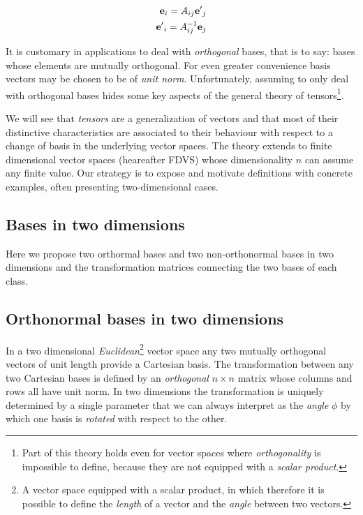 \begin{subequations}
\label{eq:twoway_basis_change}
\begin{align}
\vb{e}_i = A_{ij} {\vb{e}'}_j \\ 
{\vb{e}'}_i = A_{ij}^{-1} \vb{e}_j
\end{align}
\end{subequations}



It is customary in applications to deal with \textit{orthogonal} bases, that is to say: bases whose elements are mutually orthogonal. For even greater convenience basis vectors may be chosen to be of \textit{unit norm}. 
Unfortunately, assuming to only deal with orthogonal bases hides some key aspects of the general theory of tensors\footnote{Part of this theory holds even for vector spaces where \textit{orthogonality} is impossible to define, because they are not equipped with a \textit{scalar product}.}.   

We will see that \textit{tensors} are a generalization of vectors and that most of their distinctive characteristics are associated to their behaviour with respect to a change of basis in the underlying vector spaces. The theory extends to finite dimensional vector spaces (heareafter FDVS) whose dimensionality $n$ can assume any finite value. Our strategy is to expose and motivate definitions with concrete examples, often presenting two-dimensional cases.

\subsection{Bases in two dimensions}
Here we propose two orthormal bases and two non-orthonormal bases in two dimensions and the transformation matrices connecting the two bases of each class.  

\subsection{Orthonormal bases in two dimensions}
In a two dimensional \textit{Euclidean}\footnote{A vector space equipped with a scalar product, in which therefore it is possible to define the \textit{length} of a vector and the \textit{angle} between two vectors.} vector space any two mutually orthogonal vectors of unit length provide a Cartesian basis. The transformation between any two Cartesian bases is defined by an \textit{orthogonal} $n \times n$ matrix whose columns and rows all have unit norm. In two dimensions the transformation is uniquely determined by a single parameter that we can always interpret as the \textit{angle} $\phi$ by which one basis is \textit{rotated} with respect to the other. 

